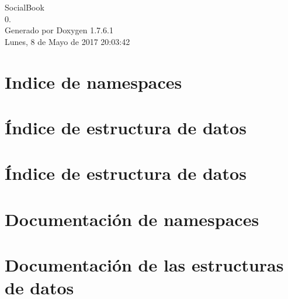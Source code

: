\documentclass[a4paper]{book}
\begin{document}
\hypersetup{pageanchor=false,citecolor=blue}
\begin{titlepage}
\vspace*{7cm}
\begin{center}
{\Large \-Social\-Book \\[1ex]\large 0. }\\
\vspace*{1cm}
{\large \-Generado por Doxygen 1.7.6.1}\\
\vspace*{0.5cm}
{\small Lunes, 8 de Mayo de 2017 20:03:42}\\
\end{center}
\end{titlepage}
\clearemptydoublepage
{}
\tableofcontents
\clearemptydoublepage
{}
\hypersetup{pageanchor=true,citecolor=blue}
\chapter{\-Indice de namespaces}

\chapter{Índice de estructura de datos}

\chapter{Índice de estructura de datos}

\chapter{\-Documentación de namespaces}

\chapter{\-Documentación de las estructuras de datos}
































\printindex
\end{document}
